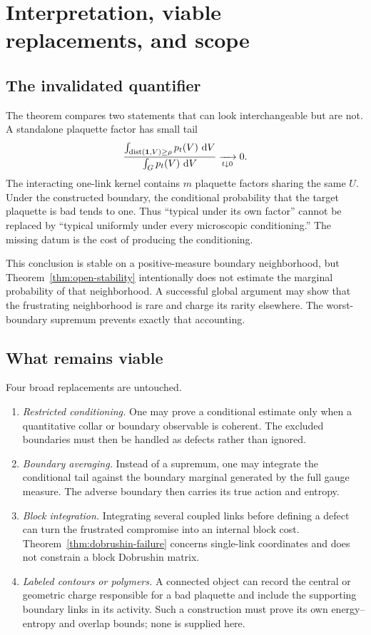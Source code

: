 \section{Interpretation, viable replacements, and scope}\label{sec:scope}

\subsection{The invalidated quantifier}

The theorem compares two statements that can look interchangeable but are
not.  A standalone plaquette factor has small tail
\[
  \frac{\int_{\operatorname{dist}(\mathbf 1,V)\geq\rho}p_t(V)\,\,\mathrm d V}
       {\int_Gp_t(V)\,\,\mathrm d V}
  \xrightarrow[t\downarrow0]{}0.
\]
The interacting one-link kernel contains $m$ plaquette factors sharing the
same $U$.  Under the constructed boundary, the conditional probability that
the target plaquette is bad tends to one.  Thus ``typical under its own
factor'' cannot be replaced by ``typical uniformly under every microscopic
conditioning.''  The missing datum is the cost of producing the conditioning.

This conclusion is stable on a positive-measure boundary neighborhood, but
Theorem~\ref{thm:open-stability} intentionally does not estimate the marginal
probability of that neighborhood.  A successful global argument may show
that the frustrating neighborhood is rare and charge its rarity elsewhere.
The worst-boundary supremum prevents exactly that accounting.

\subsection{What remains viable}

Four broad replacements are untouched.

\begin{enumerate}
\item \emph{Restricted conditioning.}  One may prove a conditional estimate
only when a quantitative collar or boundary observable is coherent.  The
excluded boundaries must then be handled as defects rather than ignored.

\item \emph{Boundary averaging.}  Instead of a supremum, one may integrate
the conditional tail against the boundary marginal generated by the full
gauge measure.  The adverse boundary then carries its true action and entropy.

\item \emph{Block integration.}  Integrating several coupled links before
defining a defect can turn the frustrated compromise into an internal block
cost.  Theorem~\ref{thm:dobrushin-failure} concerns single-link coordinates
and does not constrain a block Dobrushin matrix.

\item \emph{Labeled contours or polymers.}  A connected object can record the
central or geometric charge responsible for a bad plaquette and include the
supporting boundary links in its activity.  Such a construction must prove
its own energy--entropy and overlap bounds; none is supplied here.
\end{enumerate}

